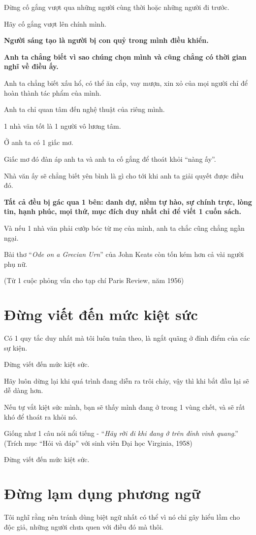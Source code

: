 \documentclass{book}
\numberwithin{equation}{section}
\begin{document}
Đừng cố gắng vượt qua những người cùng thời hoặc những người đi trước.

Hãy cố gắng vượt lên chính mình.

\textbf{Người sáng tạo là người bị con quỷ trong mình điều khiển.}

\textbf{Anh ta chẳng biết vì sao chúng chọn mình và cũng chẳng có thời gian nghĩ về điều ấy.}

Anh ta chẳng biết xấu hổ, có thể ăn cắp, vay mượn, xin xỏ của mọi người chỉ để hoàn thành tác phẩm của mình.

Anh ta chỉ quan tâm đến nghệ thuật của riêng mình.

1 nhà văn tốt là 1 người vô lương tâm.

Ở anh ta có 1 giấc mơ.

Giấc mơ đó đàn áp anh ta và anh ta cố gắng để thoát khỏi ``nàng ấy''.

Nhà văn ấy sẽ chẳng biết yên bình là gì cho tới khi anh ta giải quyết được điều đó.

\textbf{Tất cả đều bị gác qua 1 bên: danh dự, niềm tự hào, sự chính trực, lòng tin, hạnh phúc, mọi thứ, mục đích duy nhất chỉ để viết 1 cuốn sách.}

Và nếu 1 nhà văn phải cướp bóc từ mẹ của mình, anh ta chắc cũng chẳng ngần ngại.

Bài thơ ``\textit{Ode on a Grecian Urn}'' của John Keats còn tốn kém hơn cả vài người phụ nữ.

(Từ 1 cuộc phỏng vấn cho tạp chí Paris Review, năm 1956)

\section{Đừng viết đến mức kiệt sức}
Có 1 quy tắc duy nhất mà tôi luôn tuân theo, là ngắt quãng ở đỉnh điểm của các sự kiện.

Đừng viết đến mức kiệt sức.

Hãy luôn dừng lại khi quá trình đang diễn ra trôi chảy, vậy thì khi bắt đầu lại sẽ dễ dàng hơn.

Nếu tự vắt kiệt sức mình, bạn sẽ thấy mình đang ở trong 1 vùng chết, và sẽ rất khó để thoát ra khỏi nó.

Giống như 1 câu nói nổi tiếng - ``\textit{Hãy rời đi khi đang ở trên đỉnh vinh quang}.'' (Trích mục ``Hỏi và đáp'' với sinh viên Đại học Virginia, 1958)

\textsf{Đừng viết đến mức kiệt sức.}

\section{Đừng lạm dụng phương ngữ}
Tôi nghĩ rằng nên tránh dùng biệt ngữ nhất có thể vì nó chỉ gây hiểu lầm cho độc giả, những người chưa quen với điều đó mà thôi.
\end{document}
